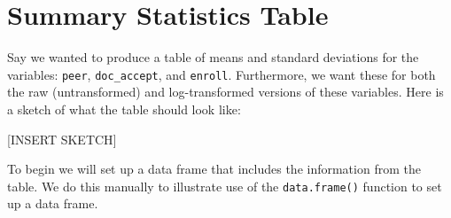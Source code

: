 \documentclass[]{book}
\newenvironment{Shaded}{\begin{snugshade}}{\end{snugshade}}
\newcommand{\CommentTok}[1]{\textcolor[rgb]{0.56,0.35,0.01}{\textit{#1}}}
\newcommand{\DataTypeTok}[1]{\textcolor[rgb]{0.13,0.29,0.53}{#1}}
\newcommand{\KeywordTok}[1]{\textcolor[rgb]{0.13,0.29,0.53}{\textbf{#1}}}
\newcommand{\NormalTok}[1]{#1}
\newcommand{\OperatorTok}[1]{\textcolor[rgb]{0.81,0.36,0.00}{\textbf{#1}}}
\newcommand{\StringTok}[1]{\textcolor[rgb]{0.31,0.60,0.02}{#1}}
\begin{document}
\begin{Shaded}
\end{Shaded}

\hypertarget{summary-statistics-table}{%
\section*{Summary Statistics Table}\label{summary-statistics-table}}

Say we wanted to produce a table of means and standard deviations for the variables: \texttt{peer}, \texttt{doc\_accept}, and \texttt{enroll}. Furthermore, we want these for both the raw (untransformed) and log-transformed versions of these variables. Here is a sketch of what the table should look like:

{[}INSERT SKETCH{]}

To begin we will set up a data frame that includes the information from the table. We do this manually to illustrate use of the \texttt{data.frame()} function to set up a data frame.
\end{document}
